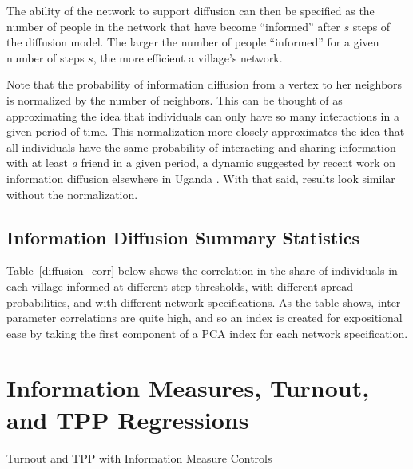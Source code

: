 \documentclass[12pt]{article}
\begin{document}
\begin{appendix}
The ability of the network to support diffusion can then be specified as the number of people in the network that have become ``informed'' after $s$ steps of the diffusion model. The larger the number of people ``informed'' for a given number of steps $s$, the more efficient a village's network.

Note that the probability of information diffusion from a vertex to her neighbors is normalized by the number of neighbors. This can be thought of as approximating the idea that individuals can only have so many interactions in a given period of time. This normalization more closely approximates the idea that all individuals have the same probability of interacting and sharing information with at least \emph{a} friend in a given period, a dynamic suggested by recent work on information diffusion elsewhere in Uganda \citep{Larson:2016uz}. With that said, results look similar without the normalization.



\subsection{Information Diffusion Summary Statistics}
Table~\ref{diffusion_corr} below shows the correlation in the share of individuals in each village informed at different step thresholds, with different spread probabilities, and with different network specifications. As the table shows, inter-parameter correlations are quite high, and so an index is created for expositional ease by taking the first component of a PCA index for each network specification.

\begin{landscape}
    
\end{landscape}

\section{Information Measures, Turnout, and TPP Regressions}\label{appendix_inforegs}


\begin{table}
\centering
\caption{Turnout and TPP with Information Measure Controls}\label{}

\end{table}

\clearpage
\pagebreak


\end{appendix}
\end{document}
